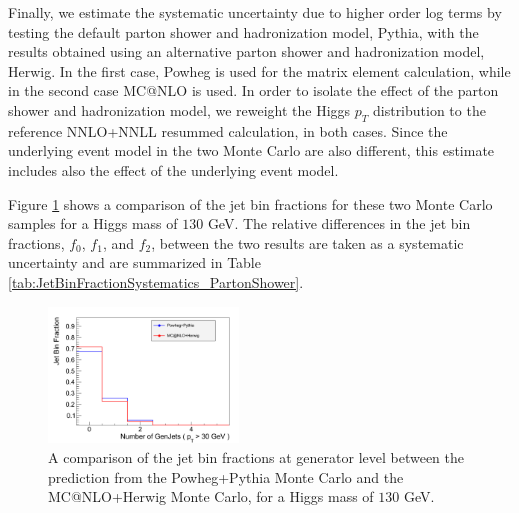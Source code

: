 
Finally, we estimate the systematic uncertainty due to higher order log terms by testing the default 
parton shower and hadronization model, Pythia, with the results obtained using an alternative
parton shower and hadronization model, Herwig. In the first case, Powheg is used for the matrix
element calculation, while in the second case MC@NLO is used. In order to isolate the effect of the 
parton shower and hadronization model, we reweight the Higgs $p_{T}$ distribution to the reference 
NNLO+NNLL resummed calculation, in both cases. Since the underlying event model in the two Monte Carlo 
are also different, this estimate includes also the effect of the underlying event model. 

Figure \ref{fig:JetBinFraction_PartonShowerComparison} shows a comparison of the jet bin fractions 
for these two Monte Carlo samples for a Higgs mass of $130$ GeV. The relative differences in the 
jet bin fractions, $f_{0}$, $f_{1}$, and $f_{2}$, between the two results are taken as a systematic
uncertainty and are summarized in Table \ref{tab:JetBinFractionSystematics_PartonShower}.

\begin{figure}[!htbp]
\begin{center}
\includegraphics[width=0.45\textwidth]{figures/JetBinFraction_PartonShowerComparison.pdf}
\caption{A comparison of the jet bin fractions at generator level between the
prediction from the Powheg+Pythia Monte Carlo and the MC@NLO+Herwig Monte 
Carlo, for a Higgs mass of $130$ GeV.}
\label{fig:JetBinFraction_PartonShowerComparison}
\end{center}
\end{figure}



